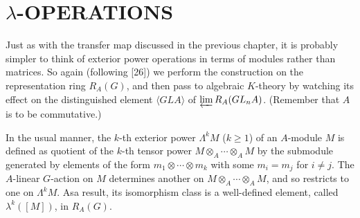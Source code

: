\section*{$\lambda$-OPERATIONS}
Just as with the transfer map discussed in the previous chapter, it is probably simpler to think of exterior power operations in terms of modules rather than matrices. So again (following [26]) we perform the construction on the representation ring $R_A(G)$, and then pass to algebraic $K$-theory by watching its effect on the distinguished element $\langle GLA \rangle$ of $\varprojlim R_A(GL_n A)$. (Remember that $A$ is to be commutative.)

In the usual manner, the $k$-th exterior power $\Lambda^k M$ ($k \geqslant 1$) of an $A$-module $M$ is defined as
quotient of the $k$-th tensor power $M\otimes_A\cdots  \otimes_A M$ by the submodule generated by elements of the form $m_1 \otimes\cdots  \otimes m_k$ with some $m_i=m_j$ for $i \neq j$. The $A$-linear $G$-action on $M$ determines another on $M\otimes_A \cdots \otimes_A M$, and so restricts to one on $\Lambda^k M$. Asa result, its isomorphism class is a well-defined element, called $\lambda^k([M])$, in $R_A(G)$.

